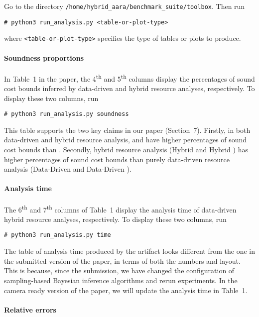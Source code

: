 Go to the directory \texttt{/home/hybrid\_aara/benchmark\_suite/toolbox}.
%
Then run
\begin{verbatim}
# python3 run_analysis.py <table-or-plot-type>
\end{verbatim}
where \texttt{<table-or-plot-type>} specifies the type of tables or plots to
produce.

\paragraph{Soundness proportions}

In Table~1 in the paper, the 4\textsuperscript{th} and 5\textsuperscript{th}
columns display the percentages of sound cost bounds inferred by data-driven and
hybrid resource analyses, respectively.
%
To display these two columns, run
\begin{verbatim}
# python3 run_analysis.py soundness
\end{verbatim}

This table supports the two key claims in our paper (Section~7).
%
Firstly, in both data-driven and hybrid resource analysis, \BayesWC{} and
\BayesPC{} have higher percentages of sound cost bounds than \Opt{}.
%
Secondly, hybrid resource analysis (Hybrid \BayesWC{} and Hybrid \BayesPC{}) has
higher percentages of sound cost bounds than purely data-driven resource
analysis (Data-Driven \BayesWC{} and Data-Driven \BayesPC{}).

\paragraph{Analysis time}

The 6\textsuperscript{th} and 7\textsuperscript{th} columns of Table~1 display
the analysis time of data-driven hybrid resource analyses, respectively.
To display these two columns, run
\begin{verbatim}
# python3 run_analysis.py time
\end{verbatim}

The table of analysis time produced by the artifact looks different from the one
in the submitted version of the paper, in terms of both the numbers and layout.
%
This is because, since the submission, we have changed the configuration of
sampling-based Bayesian inference algorithms and rerun experiments.
%
In the camera ready version of the paper, we will update the analysis time in
Table~1.

\paragraph{Relative errors}

